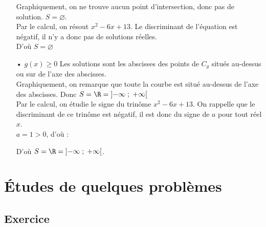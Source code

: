 \begin{itemize}
Graphiquement, on ne trouve aucun point d'intersection, donc pas de solution. $S = \varnothing$. \\ 

Par le calcul, on résout $x^2 -6x + 13$. Le discriminant de l'équation est négatif, il n'y a donc pas de solutions réelles. \\

D'où $S = \varnothing$ \\

\item[•] $g\left(x\right) \geqslant 0$ Les solutions sont les abscisses des points de $C_g$ situés au-dessus ou sur de l'axe des abscisses. \\

Graphiquement, on remarque que toute la courbe est situé au-dessus de l'axe des abscisses. Donc $S = \R = \left]-\infty \; ; \; +\infty \right[$ \\

Par le calcul, on étudie le signe du trinôme $x^2 -6x + 13$. On rappelle que le discriminant de ce trinôme est négatif, il est donc du signe de $a$ pour tout réel $x$.  \\

$a = 1 > 0$, d'où :


\vspace*{.3cm}

D'où $ S = \R = \left]-\infty \; ; \; +\infty \right[$. \\
\end{itemize}

\newpage

\section{Études de quelques problèmes}

\subsection{Exercice }


